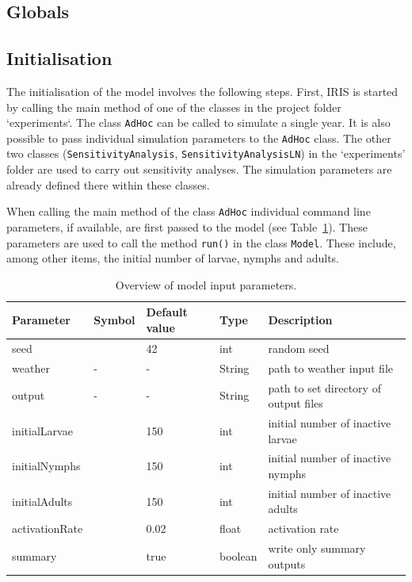\documentclass[a4paper, 11pt]{scrartcl}
\newcommand{\inlinecode}[1]{\texttt{\small #1}}
\begin{document}
\subsection{Globals}

\subsection{Initialisation}\label{initialisation}
The initialisation of the model involves the following steps. First, IRIS is started by calling the main method of one of the classes in the project folder `experiments`. The class \inlinecode{AdHoc} can be called to simulate a single year. It is also possible to pass individual simulation parameters to the \inlinecode{AdHoc} class. The other two classes (\inlinecode{SensitivityAnalysis}, \inlinecode{SensitivityAnalysisLN}) in the `experiments' folder are used to carry out sensitivity analyses. The simulation parameters are already defined there within these classes.

When calling the main method of the class \inlinecode{AdHoc} individual command line parameters, if available, are first passed to the model (see Table~\ref{tab:initialisation_parameters}). These parameters are used to call the method \inlinecode{run()} in the class \inlinecode{Model}. These include, among other items, the initial number of larvae, nymphs and adults.

\begin{table}[h!]
\caption[Overview of model input parameters.]{Overview of model input parameters.}
\label{tab:initialisation_parameters}
\begin{tabularx}{\textwidth}{lllll}
\toprule
\textbf{Parameter} 	& \textbf{Symbol} & \textbf{Default value} & \textbf{Type} & \textbf{Description} \\
\midrule
seed    			&   & 42    & int     & random seed \\
weather     		& - & -     & String  & path to weather input file \\
output     			& - & -     & String  & path to set directory of output files \\
initialLarvae       &   & 150   & int     & initial number of inactive larvae \\
initialNymphs       &   & 150   & int     & initial number of inactive nymphs \\
initialAdults       &   & 150   & int     & initial number of inactive adults \\
activationRate      &   & 0.02  & float   & activation rate  \\
summary       		&   & true & boolean & write only summary outputs \\
\bottomrule
\end{tabularx}
\end{table}
\end{document}

